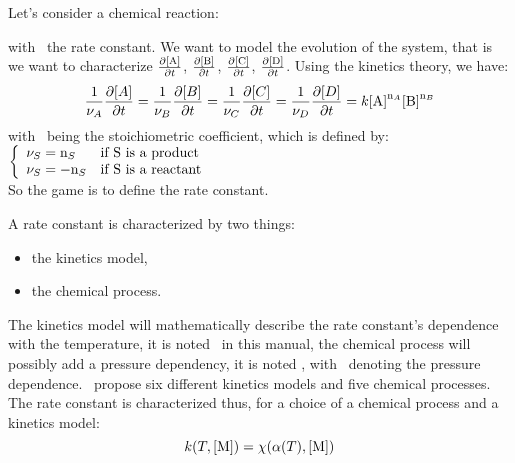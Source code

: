 Let's consider a chemical reaction:
\begin{chemicalEquation}
\label{genericX}
\end{chemicalEquation}
with \rcons\ the rate constant.
We want to model the evolution of the system, that is we want to
characterize 
$\doverdt{\conc[A]}$,
$\doverdt{\conc[B]}$,
$\doverdt{\conc[C]}$,
$\doverdt{\conc[D]}$.
Using the kinetics theory, we have:
\begin{equation}
\frac{1}{\scoef[A]}\doverdt{[A]} = 
\frac{1}{\scoef[B]}\doverdt{[B]} = 
\frac{1}{\scoef[C]}\doverdt{[C]} = 
\frac{1}{\scoef[D]}\doverdt{[D]} = 
\rcons\conc[A]^{\scoefabs[A]}\conc[B]^{\scoefabs[B]}
\end{equation}
with \scoef[A]\ being the stoichiometric coefficient, which is defined by:\\[5pt]
$\left\{\begin{array}{ll}
\scoef[S] = \scoefabs[S] & \text{if \ce{S} is a product} \\
\scoef[S] = -\scoefabs[S] & \text{if \ce{S} is a reactant} \\
\end{array}\right.$\\[5pt]
So the game is to define the rate constant. 

A rate constant is characterized by two things:
\begin{itemize}
\item the kinetics model,
\item the chemical process.
\end{itemize}
The kinetics model will mathematically describe the rate constant's dependence with
the temperature, it is noted \kinMod\ in this manual, the chemical process will
possibly add a pressure dependency, it is noted \chemProc, with \conc[M]\
denoting the pressure dependence.
\antioch\ propose six different kinetics models and five chemical processes.
The rate constant is characterized thus, for a choice of a chemical process and
a kinetics model:
\begin{equation}
\rateCons = \chemProc
\end{equation}

